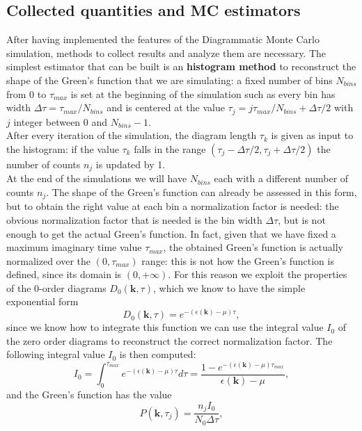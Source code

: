 \subsection{Collected quantities and MC estimators}
After having implemented the features of the Diagrammatic Monte Carlo simulation, methods to collect results and analyze them are necessary. 
The simplest estimator that can be built is an \textbf{histogram method} to reconstruct the shape of the Green's function that we are simulating: 
a fixed number of bins $N_{bins}$ from 0 to $\tau_{max}$ is set at the beginning of the simulation such as every bin has width $\Delta\tau=\tau_{max}/N_{bins}$ and is centered at the value
$\tau_{j}=j\tau_{max}/N_{bins}+\Delta\tau/2$ with $j$ integer between 0 and $N_{bins}-1$.\\
After every iteration of the simulation, the diagram length $\tau_k$ is given as input to the histogram: if the value $\tau_k$ falls in the range  
$(\tau_{j}-\Delta\tau/2,\tau_j+\Delta\tau/2)$ the number of counts $n_j$ is updated by 1.\\
At the end of the simulations we will have $N_{bins}$ each with a different number 
of counts $n_j$. The shape of the Green's function can already be assessed in this form, but to obtain the right value at each bin a normalization factor 
is needed: the obvious normalization factor that is needed is the bin width $\Delta\tau$, but is not enough to get the actual Green's function. In fact, 
given that we have fixed a maximum imaginary time value $\tau_{max}$, the obtained Green's function is actually normalized over the $(0,\tau_{max})$ range: 
this is not how the Green's function is defined, since its domain is $(0,+\infty)$. For this reason we exploit the properties of the 0-order diagrams $D_0(\mathbf{k},\tau)$, which we know to 
have the simple exponential form 
\begin{equation}
    D_0(\mathbf{k},\tau)=e^{-(\epsilon(\mathbf{k})-\mu)\tau},
\end{equation}
since we know how to integrate this function we can use the integral value $I_0$ of the zero order diagrams to reconstruct the correct normalization factor.
The following integral value $I_0$ is then computed:
\begin{equation}
    I_0=\int_{0}^{\tau_{max}}e^{-(\epsilon(\mathbf{k})-\mu)\tau}d\tau=\frac{1-e^{-(\epsilon(\mathbf{k})-\mu)\tau_{max}}}{\epsilon(\mathbf{k})-\mu},
\end{equation}
and the Green's function has the value
\begin{equation}
    P(\mathbf{k},\tau_j)=\frac{n_jI_0}{N_0\Delta\tau},
\end{equation}
